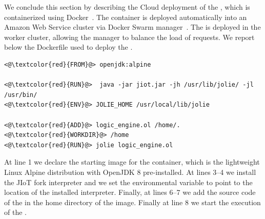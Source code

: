 We conclude this section by describing the Cloud deployment of the
, which is containerized using
Docker~\cite{Merkel:2014:DLL:2600239.2600241}. The container is deployed
automatically into an Amazon Web Service cluster via Docker Swarm
manager~\cite{Soppelsa:2017:NDC:3153103}. The  is deployed in
the worker cluster, allowing the manager to balance the load of requests. We
report below the Dockerfile used to deploy the .
%
\begin{lstlisting}
<@\textcolor{red}{FROM}@> openjdk:alpine

<@\textcolor{red}{RUN}@>  java -jar jiot.jar -jh /usr/lib/jolie/ -jl /usr/bin/
<@\textcolor{red}{ENV}@> JOLIE_HOME /usr/local/lib/jolie

<@\textcolor{red}{ADD}@> logic_engine.ol /home/. 
<@\textcolor{red}{WORKDIR}@> /home
<@\textcolor{red}{RUN}@> jolie logic_engine.ol
\end{lstlisting}
%
At line 1 we declare the starting image for the container, which is the
lightweight Linux Alpine distribution with OpenJDK 8 pre-installed. At lines
3--4 we install the JIoT fork interpreter and we set the environmental
variable  to point to the location of the installed interpreter. Finally, at lines 6--7 we add the source code of the
 in the home directory of the image.
Finally at line 8 we start the execution of the . 
